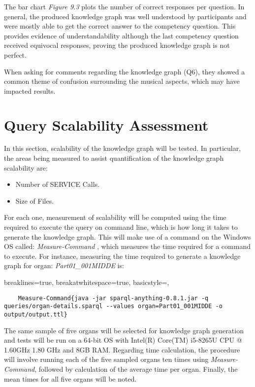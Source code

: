 The bar chart \textit{Figure 9.3} plots the number of correct responses per question. In general, the produced knowledge graph was well understood by participants and were mostly able to get the correct answer to the competency question. This provides evidence of understandability although the last competency question received equivocal responses, proving the produced knowledge graph is not perfect. 

When asking for comments regarding the knowledge graph (Q6), they showed a common theme of confusion surrounding the musical aspects, which may have impacted results. 

\section{Query Scalability Assessment}
In this section, scalability of the knowledge graph will be tested. In particular, the areas being measured to assist quantification of the knowledge graph scalability are: 

\vspace{-0.1cm}
\begin{itemize}
\itemsep0cm
    \item Number of SERVICE Calls.
    \vspace{-0.1cm}
    \item Size of Files.
\end{itemize}
\vspace{-0.1cm}

For each one, measurement of scalability will be computed using the time required to execute the query on command line, which is how long it takes to generate the knowledge graph. This will make use of a command on the Windows OS called: \textit{Measure-Command} \cite{measurecommand}, which measures the time required for a command to execute. For instance, measuring the time required to generate a knowledge graph for organ: \textit{Part01\_001MIDDE} is:

\lstset
{
    breaklines=true,
    breakatwhitespace=true,
    basicstyle=\linespread{1.5}\ttfamily,
}
\begin{lstlisting}
    Measure-Command{java -jar sparql-anything-0.8.1.jar -q queries/organ-details.sparql --values organ=Part01_001MIDDE -o output/output.ttl}
\end{lstlisting}

The same sample of five organs will be selected for knowledge graph generation and tests will be run on a 64-bit OS with Intel(R) Core(TM) i5-8265U CPU @ 1.60GHz 1.80 GHz and 8GB RAM. Regarding time calculation, the procedure will involve running each of the five sampled organs ten times using \textit{Measure-Command}, followed by calculation of the average time per organ. Finally, the mean times for all five organs will be noted.

